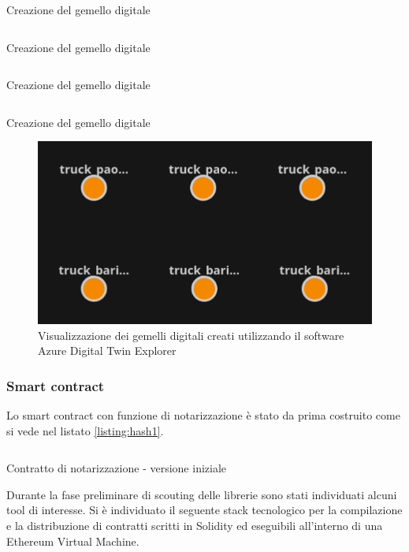 \documentclass[a4paper,11pt]{article}
\newenvironment{longlisting}{\captionsetup{type=figure}}{}
\begin{document}
\begin{longlisting}
  \inputminted{java}{./code/dt.create.java}
  \caption{Creazione del gemello digitale}
  \label{listing:dt2}
\end{longlisting}


\begin{longlisting}
  \inputminted{java}{./code/dt.init.java}
  \caption{Creazione del gemello digitale}
  \label{listing:dt3}
\end{longlisting}

\begin{longlisting}
  \inputminted{java}{./code/dt.polling.java}
  \caption{Creazione del gemello digitale}
  \label{listing:dt4}
\end{longlisting}

\begin{longlisting}
  \inputminted{java}{./code/dt.update.java}
  \caption{Creazione del gemello digitale}
  \label{listing:dt5}
\end{longlisting}

\begin{figure}[H]
  \centering
  \includegraphics[width=0.5\linewidth]{img/dt_explorer.png}
  \caption{Visualizzazione dei gemelli digitali creati utilizzando il software Azure Digital Twin Explorer }
  \label{fig:azureexplorer}
\end{figure}

\subsubsection{Smart contract}

Lo smart contract con funzione di notarizzazione è stato da prima costruito come si vede nel listato \ref{listing:hash1}.

\begin{listing}[H]
  \inputminted{solidity}{./code/Hash.v1.sol}
  \caption{Contratto di notarizzazione - versione iniziale}
  \label{listing:hash1}
\end{listing}

Durante la fase preliminare di scouting delle librerie sono stati individuati alcuni tool di interesse. Si è individuato il seguente stack tecnologico per la compilazione e la distribuzione di contratti scritti in Solidity ed eseguibili all'interno di una Ethereum Virtual Machine.
\end{document}
